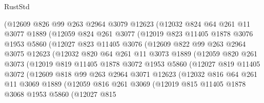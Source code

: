 \begin{lexlean}{RustStd}
\begin{coremodule}
          (@12609
            @826
            @99
            @263
            @2964
            @3079
            @12623
            (@12032
              @824
              @64
              @261
              @11
              @3077
              @1889
              (@12059
                @824
                @261
                @3077
                (@12019
                  @823
                  @11405
                  @1878
                  @3076
                  @1953
                  @5860
                  (@12027
                    @823
                    @11405
                    @3076
                    (@12609
                      @822
                      @99
                      @263
                      @2964
                      @3075
                      @12623
                      (@12032
                        @820
                        @64
                        @261
                        @11
                        @3073
                        @1889
                        (@12059
                          @820
                          @261
                          @3073
                          (@12019
                            @819
                            @11405
                            @1878
                            @3072
                            @1953
                            @5860
                            (@12027
                              @819
                              @11405
                              @3072
                              (@12609
                                @818
                                @99
                                @263
                                @2964
                                @3071
                                @12623
                                (@12032
                                  @816
                                  @64
                                  @261
                                  @11
                                  @3069
                                  @1889
                                  (@12059
                                    @816
                                    @261
                                    @3069
                                    (@12019
                                      @815
                                      @11405
                                      @1878
                                      @3068
                                      @1953
                                      @5860
                                      (@12027
                                        @815

\end{coremodule}
\end{lexlean}
